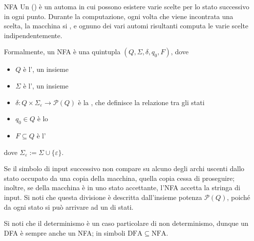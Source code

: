 \documentclass[a4paper, 12pt]{report}
\begin{document}
    \begin{frameddefn}{NFA}
        Un  () è un automa in cui possono esistere varie scelte per lo stato successivo in ogni punto. Durante la computazione, ogni volta che viene incontrata una scelta, la macchina si , e ognuno dei vari automi risultanti computa le varie scelte indipendentemente.

        Formalmente, un NFA è una quintupla $(Q, \Sigma, \delta, q_0, F)$, dove

        \begin{itemize}
            \item $Q$ è l', un insieme 
            \item $\Sigma$ è l', un insieme 
            \item $\delta: Q \times \Sigma_{\varepsilon} \rightarrow \mathcal{P}(Q)$ è la , che definisce la relazione tra gli stati
            \item $q_0 \in Q$ è lo 
            \item $F \subseteq Q$ è l'
        \end{itemize}

        dove $\Sigma_{\varepsilon} := \Sigma \cup \{\varepsilon\}$.

        Se il simbolo di input successivo non compare su alcuno degli archi uscenti dallo stato occupato da una copia della macchina, quella copia cessa di proseguire; inoltre, se  della macchina è in uno stato accettante, l'NFA accetta la stringa di input. Si noti che questa divisione è descritta dall'insieme potenza $\mathcal{P}(Q)$, poiché da ogni stato si può arrivare ad un  di stati.

        Si noti che il determinismo è un caso particolare di non determinismo, dunque un DFA è sempre anche un NFA; in simboli $\mathrm{DFA} \subseteq \mathrm{NFA}$.
    \end{frameddefn}
\end{document}
